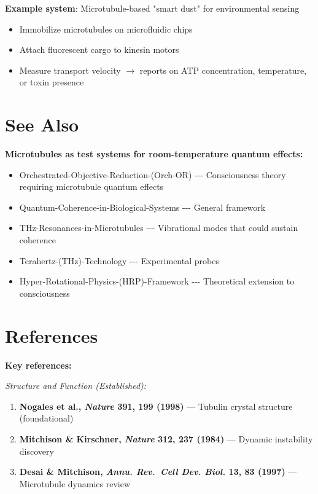 \textbf{Example system}: Microtubule-based "smart dust" for environmental sensing
\begin{itemize}
\item Immobilize microtubules on microfluidic chips
\item Attach fluorescent cargo to kinesin motors
\item Measure transport velocity $\rightarrow$ reports on ATP concentration, temperature, or toxin presence
\end{itemize}

\section{See Also}
\label{sec:see-also}

\textbf{Microtubules as test systems for room-temperature quantum effects:}
\begin{itemize}
\tightlist
\item
  Orchestrated-Objective-Reduction-(Orch-OR) -\/-\/-
  Consciousness theory requiring microtubule quantum effects
\item
  Quantum-Coherence-in-Biological-Systems -\/-\/- General
  framework
\item
  THz-Resonances-in-Microtubules -\/-\/- Vibrational modes
  that could sustain coherence
\item
  Terahertz-(THz)-Technology -\/-\/- Experimental probes
\item
  Hyper-Rotational-Physics-(HRP)-Framework -\/-\/-
  Theoretical extension to consciousness
\end{itemize}

\section{References}
\label{sec:references}

\textbf{Key references:}

\textit{Structure and Function (Established):}
\begin{enumerate}
\item \textbf{Nogales et al., \emph{Nature} 391, 199 (1998)} --- Tubulin crystal structure (foundational)
\item \textbf{Mitchison \& Kirschner, \emph{Nature} 312, 237 (1984)} --- Dynamic instability discovery
\item \textbf{Desai \& Mitchison, \emph{Annu. Rev.~Cell Dev. Biol.} 13, 83 (1997)} --- Microtubule dynamics review
\end{enumerate}

